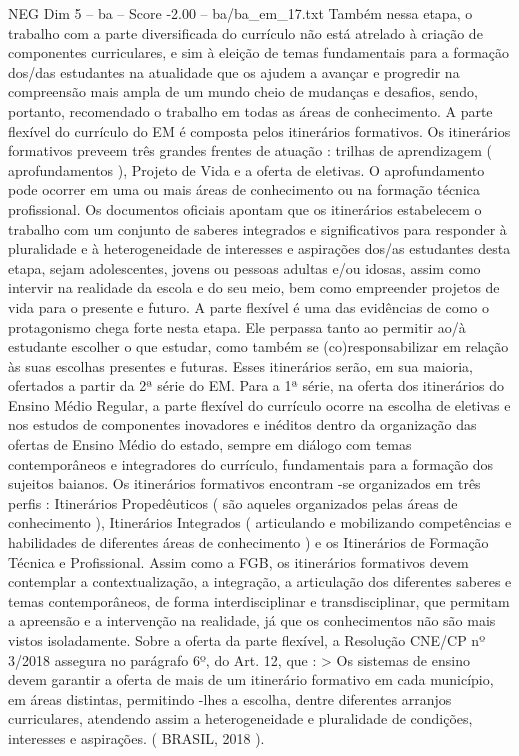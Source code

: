 \begin{textsample}{NEG Dim 5 – ba – Score -2.00 – ba/ba\_em\_17.txt}
Também nessa etapa, o trabalho com a parte diversificada do currículo não está atrelado à criação de componentes curriculares, e sim à eleição de temas fundamentais para a formação dos/das estudantes na atualidade que os ajudem a avançar e progredir na compreensão mais ampla de um mundo cheio de mudanças e desafios, sendo, portanto, recomendado o trabalho em todas as áreas de conhecimento.
A parte flexível do currículo do EM é composta pelos itinerários formativos.
Os itinerários formativos preveem três grandes frentes de atuação : trilhas de aprendizagem ( aprofundamentos ), Projeto de Vida e a oferta de eletivas.
O aprofundamento pode ocorrer em uma ou mais áreas de conhecimento ou na formação técnica profissional.
Os documentos oficiais apontam que os itinerários estabelecem o trabalho com um conjunto de saberes integrados e significativos para responder à pluralidade e à heterogeneidade de interesses e aspirações dos/as estudantes desta etapa, sejam adolescentes, jovens ou pessoas adultas e/ou idosas, assim como intervir na realidade da escola e do seu meio, bem como empreender projetos de vida para o presente e futuro.
A parte flexível é uma das evidências de como o protagonismo chega forte nesta etapa.
Ele perpassa tanto ao permitir ao/à estudante escolher o que estudar, como também se (co)responsabilizar em relação às suas escolhas presentes e futuras.
Esses itinerários serão, em sua maioria, ofertados a partir da 2ª série do EM.
Para a 1ª série, na oferta dos itinerários do Ensino Médio Regular, a parte flexível do currículo ocorre na escolha de eletivas e nos estudos de componentes inovadores e inéditos dentro da organização das ofertas de Ensino Médio do estado, sempre em diálogo com temas contemporâneos e integradores do currículo, fundamentais para a formação dos sujeitos baianos.
Os itinerários formativos encontram -se organizados em três perfis : Itinerários Propedêuticos ( são aqueles organizados pelas áreas de conhecimento ), Itinerários Integrados ( articulando e mobilizando competências e habilidades de diferentes áreas de conhecimento ) e os Itinerários de Formação Técnica e Profissional.
Assim como a FGB, os itinerários formativos devem contemplar a contextualização, a integração, a articulação dos diferentes saberes e temas contemporâneos, de forma interdisciplinar e transdisciplinar, que permitam a apreensão e a intervenção na realidade, já que os conhecimentos não são mais vistos isoladamente.
Sobre a oferta da parte flexível, a Resolução CNE/CP nº 3/2018 assegura no parágrafo 6º, do Art. 12, que : > Os sistemas de ensino devem garantir a oferta de mais de um itinerário formativo em cada município, em áreas distintas, permitindo -lhes a escolha, dentre diferentes arranjos curriculares, atendendo assim a heterogeneidade e pluralidade de condições, interesses e aspirações. ( BRASIL, 2018 ).

\end{textsample}
